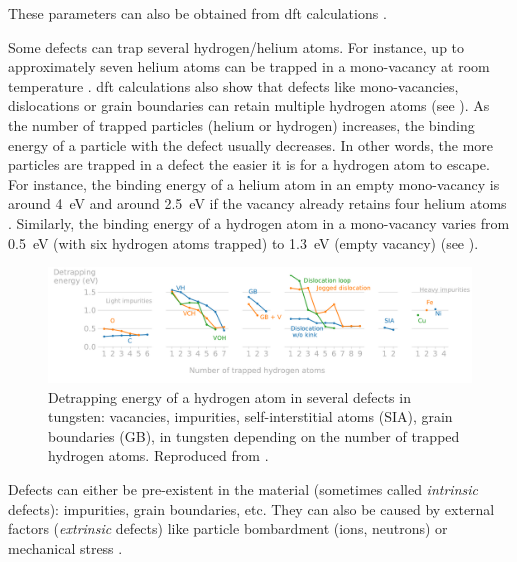 These parameters can also be obtained from \gls{dft} calculations .

Some defects can trap several hydrogen/helium atoms.
For instance, up to approximately seven helium atoms can be trapped in a mono-\gls{vacancy} at room temperature .
\gls{dft} calculations also show that defects like mono-vacancies, dislocations or grain boundaries can retain multiple hydrogen atoms (see ).
As the number of trapped particles (helium or hydrogen) increases, the binding energy of a particle with the defect usually decreases.
In other words, the more particles are trapped in a defect the easier it is for a hydrogen atom to escape.
For instance, the binding energy of a helium atom in an empty mono-\gls{vacancy} is around \SI{4}{eV} and around \SI{2.5}{eV} if the \gls{vacancy} already retains four helium atoms \cite{faney_spatially_2015}.
Similarly, the binding energy of a hydrogen atom in a mono-\gls{vacancy} varies from \SI{0.5}{eV} (with six hydrogen atoms trapped) to \SI{1.3}{eV} (empty \gls{vacancy}) (see ).

\begin{figure}
    \centering
    \includegraphics[width=\linewidth]{Figures/Chapter1/trapping_energy_hydrogen_in_tungsten.pdf}
    \caption{Detrapping energy of a hydrogen atom in several defects in tungsten: vacancies, impurities, self-interstitial atoms (SIA), grain boundaries (GB), in tungsten depending on the number of trapped hydrogen atoms. Reproduced from \cite{hodille_study_2016}.}
\end{figure}

Defects can either be pre-existent in the material (sometimes called \textit{intrinsic} defects): impurities, grain boundaries, etc.
They can also be caused by external factors (\textit{extrinsic} defects) like particle bombardment (ions, neutrons)  or mechanical stress .

